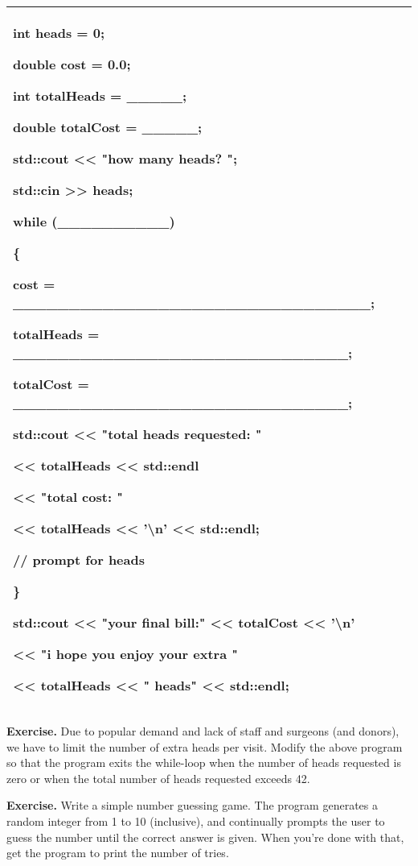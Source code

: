 \documentclass[
]{article}
\begin{document}
\begin{longtable}[]{@{}l@{}}
\toprule
\endhead
\begin{minipage}[t]{0.97\columnwidth}\raggedright
int heads = 0;

double cost = 0.0;

int totalHeads = \_\_\_\_\_;

double totalCost = \_\_\_\_\_;

std::cout \textless\textless{} "how many heads? ";

std::cin \textgreater\textgreater{} heads;

while (\_\_\_\_\_\_\_\_\_\_)

\{

cost = \_\_\_\_\_\_\_\_\_\_\_\_\_\_\_\_\_\_\_\_\_\_\_\_\_\_\_\_\_\_\_\_;

totalHeads =
\_\_\_\_\_\_\_\_\_\_\_\_\_\_\_\_\_\_\_\_\_\_\_\_\_\_\_\_\_\_;

totalCost =
\_\_\_\_\_\_\_\_\_\_\_\_\_\_\_\_\_\_\_\_\_\_\_\_\_\_\_\_\_\_;

std::cout \textless\textless{} "total heads requested: "

\textless\textless{} totalHeads \textless\textless{} std::endl

\textless\textless{} "total cost: "

\textless\textless{} totalHeads \textless\textless{} '\textbackslash n'
\textless\textless{} std::endl;

// prompt for heads

\}

std::cout \textless\textless{} "your final bill:" \textless\textless{}
totalCost \textless\textless{} '\textbackslash n'

\textless\textless{} "i hope you enjoy your extra "

\textless\textless{} totalHeads \textless\textless{} " heads"
\textless\textless{} std::endl;\strut
\end{minipage}\tabularnewline
\bottomrule
\end{longtable}

\textbf{Exercise. }Due to popular demand and lack of staff and surgeons
(and donors), we have to limit the number of extra heads per visit.
Modify the above program so that the program exits the while-loop when
the number of heads requested is zero or when the total number of heads
requested exceeds 42.

\textbf{Exercise.} Write a simple number guessing game. The program
generates a random integer from 1 to 10 (inclusive), and continually
prompts the user to guess the number until the correct answer is given.
When you're done with that, get the program to print the number of
tries.
\end{document}
